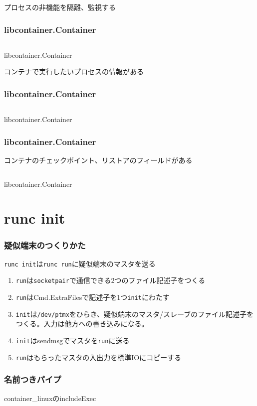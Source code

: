 \documentclass[unicode, 14pt, aspectratio=169]{beamer}
\begin{document}
\begin{frame}[t]
  プロセスの非機能を隔離、監視\supercite{rdt}する
  \frametitle{libcontainer.Container}
  \begin{center}
    \inputminted{go}{code/container2.go}
    libcontainer.Container\supercite{libcontainer}
  \end{center}
\end{frame}
\begin{frame}[t]
  コンテナで実行したいプロセスの情報がある
  \frametitle{libcontainer.Container}
  \begin{center}
    \inputminted{go}{code/container3.go}
    libcontainer.Container\supercite{libcontainer}
  \end{center}
\end{frame}
\begin{frame}[t]
  \frametitle{libcontainer.Container}
  コンテナのチェックポイント、リストアのフィールドがある\supercite{criu}
  \begin{center}
    \inputminted{go}{code/container4.go}
    libcontainer.Container\supercite{libcontainer}
  \end{center}
\end{frame}
\section{runc init}
\begin{frame}[t]
  \frametitle{疑似端末のつくりかた}
  \texttt{runc init}は\texttt{runc run}に疑似端末のマスタを送る
  
  \begin{enumerate}[leftmargin=1.2cm]
  \item \texttt{run}は\texttt{socketpair}で通信できる2つのファイル記述子をつくる
  \item \texttt{run}はCmd.ExtraFilesで記述子を1つ\texttt{init}にわたす 
  \item \texttt{init}は\texttt{/dev/ptmx}をひらき、疑似端末のマスタ/スレーブのファイル記述子をつくる。入力は他方への書き込みになる。
  \item \texttt{init}はsendmsgでマスタを\texttt{run}に送る
  \item \texttt{run}はもらったマスタの入出力を標準IOにコピーする
  \end{enumerate}
\end{frame}
\begin{frame}[t]
  \frametitle{名前つきパイプ}
  container_linuxのincludeExec
\end{frame}
\end{document}
